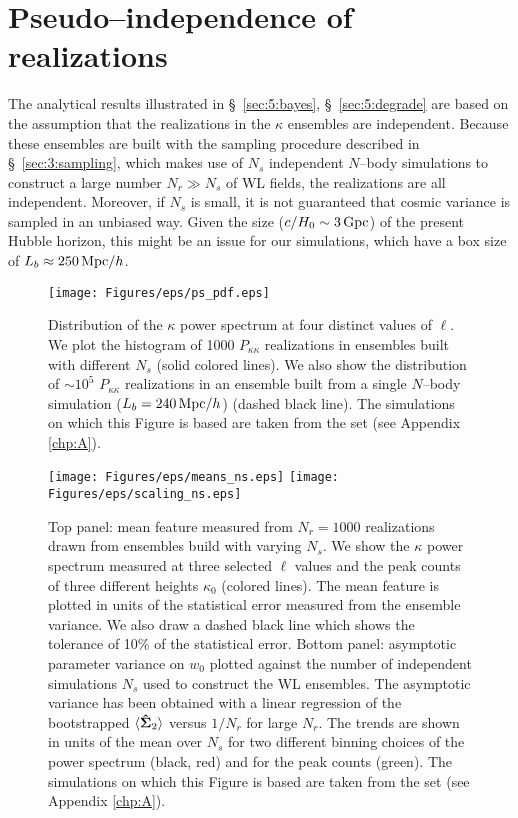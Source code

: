 \section{Pseudo--independence of realizations}
\label{sec:5:pseudo}
The analytical results illustrated in \S~\ref{sec:5:bayes}, \S~\ref{sec:5:degrade} are based on the assumption that the realizations in the $\kappa$ ensembles are independent. Because these ensembles are built with the sampling procedure described in \S~\ref{sec:3:sampling}, which makes use of $N_s$ independent $N$--body simulations to construct a large number $N_r\gg N_s$ of WL fields, the realizations are all independent. Moreover, if $N_s$ is small, it is not guaranteed that cosmic variance is sampled in an unbiased way. Given the size ($c/H_0\sim 3\,{\rm Gpc}$) of the present Hubble horizon, this might be an issue for our simulations, which have a box size of $L_b\approx 250\,{\rm Mpc}/h$. 
%
\begin{figure}
\begin{center}
\texttt{[image: Figures/eps/ps\_pdf.eps]}
\end{center}
\caption{Distribution of the $\kappa$ power spectrum at four distinct values of $\ell$. We plot the histogram of 1000 $P_{\kappa\kappa}$ realizations in ensembles built with different $N_s$ (solid colored lines). We also show the distribution of $\sim 10^5$ $P_{\kappa\kappa}$ realizations in an ensemble built from a single $N$--body simulation ($L_b=240\,{\rm Mpc}/h$) (dashed black line). The simulations on which this Figure is based are taken from the  set (see Appendix \ref{chp:A}).}
\label{fig:5:pspdf}
\end{figure}
%
\begin{figure}
\begin{center}
\texttt{[image: Figures/eps/means\_ns.eps]} \texttt{[image: Figures/eps/scaling\_ns.eps]}
\end{center}
\caption{Top panel: mean feature measured from $N_r=1000$ realizations drawn from ensembles build with varying $N_s$. We show the $\kappa$ power spectrum measured at three selected $\ell$ values and the peak counts of three different heights $\kappa_0$ (colored lines). The mean feature is plotted in units of the statistical error measured from the ensemble variance. We also draw a dashed black line which shows the tolerance of 10\% of the statistical error. Bottom panel: asymptotic parameter variance on $w_0$ plotted against the number of independent simulations $N_s$ used to construct the WL ensembles. The asymptotic variance has been obtained with a linear regression of the bootstrapped $\langle\mathbf{\hat{\Sigma}}_2\rangle$ versus $1/N_r$ for large $N_r$. The trends are shown in units of the mean over $N_s$ for two different binning choices of the power spectrum (black, red) and for the peak counts (green). The simulations on which this Figure is based are taken from the  set (see Appendix \ref{chp:A}).}
\label{fig:5:mcns}
\end{figure}
